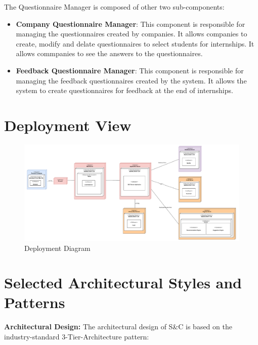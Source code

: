 \par The Questionnaire Manager is composed of other two sub-components:
\begin{itemize}
      \item \textbf{Company Questionnaire Manager}: This component is responsible for managing the questionnaires created by companies.
            It allows companies to create, modify and delate questionnaires to select students for internships.
            It allows commpanies to see the answers to the questionnaires.
      \item \textbf{Feedback Questionnaire Manager}: This component is responsible for managing the feedback questionnaires created by the system.
            It allows the system to create questionnaires for feedback at the end of internships.
\end{itemize}

\section{Deployment View}

\begin{figure}[H]
    \centering
    \includegraphics[width=1.0\textwidth]{Images/Deployment_Diagram.pdf}
    \caption{Deployment Diagram}
    \label{fig:deployment-diagram}
\end{figure}


\section{Selected Architectural Styles and Patterns}
\label{sec:selected-architectural-styles-patterns}%

\par{\textbf{Architectural Design:}} The architectural design of S\&C is based on the industry-standard 3-Tier-Architecture pattern:

